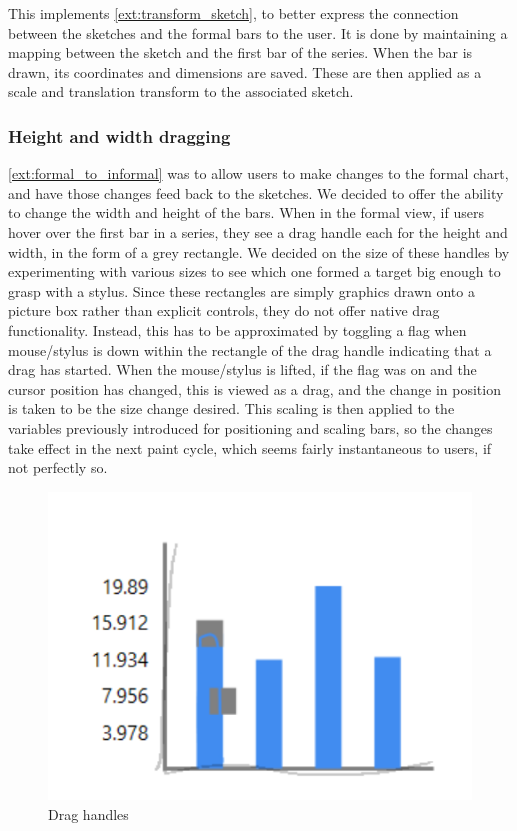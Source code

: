 	This implements \ref{ext:transform_sketch}, to better express the connection between the sketches and the formal bars to the user. It is done by maintaining a mapping between the sketch and the first bar of the series. When the bar is drawn, its coordinates and dimensions are saved. These are then applied as a scale and translation transform to the associated sketch.
	
	
	\subsubsection{Height and width dragging}
	\ref{ext:formal_to_informal} was to allow users to make changes to the formal chart, and have those changes feed back to the sketches. We decided to offer the ability to change the width and height of the bars. When in the formal view, if users hover over the first bar in a series, they see a drag handle each for the height and width, in the form of a grey rectangle. We decided on the size of these handles by experimenting with various sizes to see which one formed a target big enough to grasp with a stylus. Since these rectangles are simply graphics drawn onto a picture box rather than explicit controls, they do not offer native drag functionality. Instead, this has to be approximated by toggling a flag when mouse/stylus is down within the rectangle of the drag handle indicating that a drag has started. When the mouse/stylus is lifted, if the flag was on and the cursor position has changed, this is viewed as a drag, and the change in position is taken to be the size change desired. This scaling is then applied to the variables previously introduced for positioning and scaling bars, so the changes take effect in the next paint cycle, which seems fairly instantaneous to users, if not perfectly so.
	
	\begin{figure}
	\centering
	\includegraphics[scale=1]{draghandles}
	\caption{Drag handles}
	\end{figure}		
	
